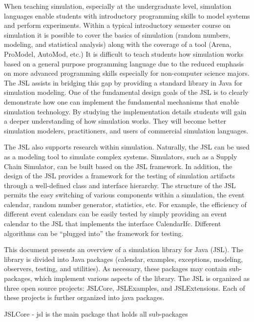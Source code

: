 \documentclass[
]{book}
\theoremstyle{definition}
\theoremstyle{definition}
\theoremstyle{definition}
\theoremstyle{definition}
\theoremstyle{remark}
\begin{document}
When teaching simulation, especially at the undergraduate level, simulation languages enable students with introductory programming skills to model systems and perform experiments. Within a typical introductory semester course on simulation it is possible to cover the basics of simulation (random numbers, modeling, and statistical analysis) along with the coverage of a tool (Arena, ProModel, AutoMod, etc.) It is difficult to teach students how simulation works based on a general purpose programming language due to the reduced emphasis on more advanced programming skills especially for non-computer science majors. The JSL assists in bridging this gap by providing a standard library in Java for simulation modeling. One of the fundamental design goals of the JSL is to clearly demonstrate how one can implement the fundamental mechanisms that enable simulation technology. By studying the implementation details students will gain a deeper understanding of how simulation works. They will become better simulation modelers, practitioners, and users of commercial simulation languages.

The JSL also supports research within simulation. Naturally, the JSL can be used as a modeling tool to simulate complex systems. Simulators, such as a Supply Chain Simulator, can be built based on the JSL framework. In addition, the design of the JSL provides a framework for the testing of simulation artifacts through a well-defined class and interface hierarchy. The structure of the JSL permits the easy switching of various components within a simulation, the event calendar, random number generator, statistics, etc. For example, the efficiency of different event calendars can be easily tested by simply providing an event calendar to the JSL that implements the interface CalendarIfc. Different algorithms can be ``plugged into'' the framework for testing.

This document presents an overview of a simulation library for Java (JSL). The library is divided into Java packages (calendar, examples, exceptions, modeling, observers, testing, and utilities). As necessary, these packages may contain sub-packages, which implement various aspects of the library. The JSL is organized as three open source projects: JSLCore, JSLExamples, and JSLExtensions. Each of these projects is further organized into java packages.

JSLCore - jsl is the main package that holds all sub-packages
\end{document}
